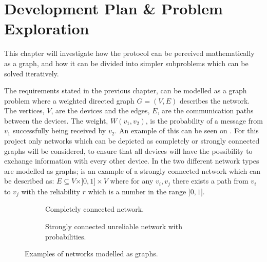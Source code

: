 \chapter{Development Plan \& Problem Exploration}\label{chp:Problems}
This chapter will investigate how the protocol can be perceived mathematically as a graph, and how it can be divided into simpler subproblems which can be solved iteratively.

The requirements stated in the previous chapter, can be modelled as a graph problem where a weighted directed graph $G = (V, E)$ describes the network. 
The vertices, $V$, are the devices and the edges, $E$, are the communication paths between the devices. 
The weight, $W(v_1, v_2)$, is the probability of a message from $v_1$ successfully being received by $v_2$.
An example of this can be seen on .
For this project only networks which can be depicted as completely or strongly connected graphs will be considered, to ensure that all devices will have the possibility to exchange information with every other device.
In  the two different network types are modelled as graphs;  is an example of a strongly connected network which can be described as: $E \subseteq V \times ]0,1] \times V$ where for any $v_i, v_j$ there exists a path from $v_i$ to $v_j$ with the reliability $r$ which is a number in the range $]0,1]$.

\begin{figure}[h]
    \begin{subfigure}{0.5\linewidth}
        \centering
        
        \caption{Completely connected network.}
        \label{fig:ccrcnetworkgraph}
    \end{subfigure}\hfill
    \begin{subfigure}{0.5\linewidth}
        \centering
        
        \caption{Strongly connected unreliable network with probabilities.}
        \label{fig:network}
    \end{subfigure}
    \caption{Examples of networks modelled as graphs.}
    \label{fig:examplenetworkgraphs} 
\end{figure}

